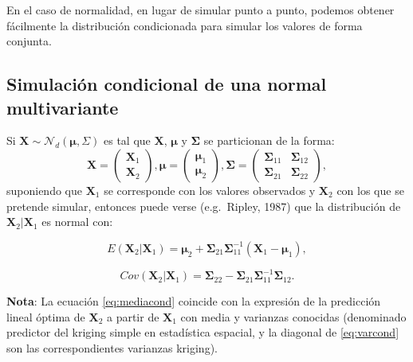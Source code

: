\documentclass[
]{book}
\theoremstyle{break}
\theoremstyle{definition}
\theoremstyle{definition}
\theoremstyle{definition}
\theoremstyle{definition}
\theoremstyle{remark}
\begin{document}
En el caso de normalidad, en lugar de simular punto a punto,
podemos obtener fácilmente la distribución condicionada
para simular los valores de forma conjunta.

\hypertarget{condnormal}{%
\subsection{Simulación condicional de una normal multivariante}\label{condnormal}}

Si \(\mathbf{X} \sim \mathcal{N}_d\left( \boldsymbol\mu,\Sigma \right)\) es tal que \(\mathbf{X}\), \(\boldsymbol\mu\) y \(\boldsymbol\Sigma\) se particionan de la forma:
\[\mathbf{X} =
\begin{pmatrix}
 \mathbf{X}_1 \\
 \mathbf{X}_2
\end{pmatrix},  
\boldsymbol\mu =
\begin{pmatrix}
 \boldsymbol\mu_1 \\
 \boldsymbol\mu_2
\end{pmatrix}, 
\boldsymbol\Sigma =
\begin{pmatrix}
 \boldsymbol\Sigma_{11} & \boldsymbol\Sigma_{12} \\
 \boldsymbol\Sigma_{21} & \boldsymbol\Sigma_{22}
\end{pmatrix},\]
suponiendo que \(\mathbf{X}_1\) se corresponde con los valores observados y \(\mathbf{X}_2\) con los que se pretende simular,
entonces puede verse (e.g.~Ripley, 1987) que la distribución de \(\mathbf{X}_2 | \mathbf{X}_1\) es normal con:

\begin{equation}
E \left( \mathbf{X}_2 | \mathbf{X}_1 \right) = \boldsymbol\mu_2 + \boldsymbol\Sigma_{21} \boldsymbol\Sigma_{11}^{-1}
\left(  \mathbf{X}_1 - \boldsymbol\mu_1 \right), 
\label{eq:mediacond}
\end{equation}

\begin{equation}
Cov \left( \mathbf{X}_2 | \mathbf{X}_1 \right) =
\boldsymbol\Sigma_{22} - \boldsymbol\Sigma_{21} \boldsymbol\Sigma_{11}^{-1} \boldsymbol\Sigma_{12}.
\label{eq:varcond}
\end{equation}

\textbf{Nota}: La ecuación \eqref{eq:mediacond} coincide con la expresión de la predicción lineal óptima de \(\mathbf{X}_2\)
a partir de \(\mathbf{X}_1\) con media y varianzas conocidas (denominado predictor del kriging simple en estadística espacial, y la diagonal de \eqref{eq:varcond} son las correspondientes varianzas kriging).
\end{document}
